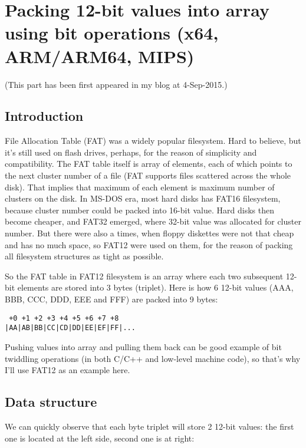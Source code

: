 \section{Packing 12-bit values into array using bit operations (x64, ARM/ARM64, MIPS)}

(This part has been first appeared in my blog at 4-Sep-2015.)

\subsection{Introduction}

File Allocation Table (FAT) was a widely popular filesystem.
Hard to believe, but it's still used on flash drives, perhaps, for the reason of simplicity and compatibility.
The FAT table itself is array of elements, each of which points to the next cluster number of a file 
(FAT supports files scattered across the whole disk).
That implies that maximum of each element is maximum number of clusters on the disk.
In MS-DOS era, most hard disks has FAT16 filesystem, because cluster number could be packed into 16-bit value.
Hard disks then become cheaper, and FAT32 emerged, where 32-bit value was allocated for cluster number.
But there were also a times, when floppy diskettes were not that cheap and has no much space, so FAT12 were used on them,
for the reason of packing all filesystem structures as tight as possible.

So the FAT table in FAT12 filesystem is an array where each two subsequent 12-bit elements are stored into 3 bytes (triplet).
Here is how 6 12-bit values (AAA, BBB, CCC, DDD, EEE and FFF) are packed into 9 bytes:

\begin{lstlisting}
 +0 +1 +2 +3 +4 +5 +6 +7 +8
|AA|AB|BB|CC|CD|DD|EE|EF|FF|...
\end{lstlisting}

Pushing values into array and pulling them back can be good example of bit twiddling operations (in both C/C++ and low-level machine code),
so that's why I'll use FAT12 as an example here.

\subsection{Data structure}

We can quickly observe that each byte triplet will store 2 12-bit values: the first one is located at the left side, second one is at right:

